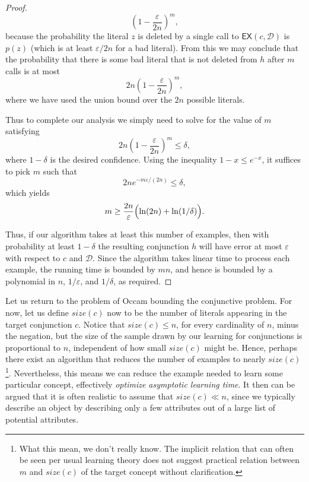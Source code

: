 \begin{proof}
    \[
    \left(1-\frac{\varepsilon}{2n}\right)^m,
    \]
    because the probability the literal $z$ is deleted by a single call to $\mathsf{EX}(c,  \mathcal{D})$ is $p(z)$ (which is at least $\varepsilon/2n$ for a bad literal).  From     this we may conclude that the probability that there is some bad literal that is not    deleted from $h$ after $m$ calls is at most
    \[
    2n\left(1-\frac{\varepsilon}{2n}\right)^m,
    \]
    where we have used the union bound over the $2n$ possible literals.

    Thus to complete our analysis we simply need to solve for the value of $m$ satisfying
    \[
    2n\left(1-\frac{\varepsilon}{2n}\right)^m \le \delta,
    \]
    where $1-\delta$ is the desired confidence.  Using the inequality $1-x \le e^{-x}$,     it suffices to pick $m$ such that
    \[
    2n e^{-m\varepsilon/(2n)} \le \delta,
    \]
    which yields
    \[
    m \ge \frac{2n}{\varepsilon}\Bigl(\ln(2n)+\ln(1/\delta)\Bigr).
    \]

    Thus, if our algorithm takes at least this number of examples, then with probability    at least $1-\delta$ the resulting conjunction $h$ will have error at most  $\varepsilon$ with respect to $c$ and $\mathcal{D}$.  Since the algorithm takes  linear time to process each example, the running time is bounded by $mn$, and hence  is bounded by a polynomial in $n$, $1/\varepsilon$, and $1/\delta$, as required.
\end{proof}

Let us return to the problem of Occam bounding the conjunctive problem. For now, let us define $size(c)$ now to be the number of literals appearing in the target conjunction $c$. Notice that $size(c)\leq n$, for every cardinality of $n$, minus the negation, but the size of the sample drawn by our learning for conjunctions is proportional to $n$, independent of how small $size(c)$ might be. Hence, perhaps there exist an algorithm that reduces the number of examples to nearly $size(c)$ \footnote{What this mean, we don't really know. The implicit relation that can often be seen per usual learning theory does not suggest practical relation between $m$ and $size(c)$ of the target concept without clarification.}. Nevertheless, this means we can reduce the example needed to learn some particular concept, effectively \textit{optimize asymptotic learning time}. It then can be argued that it is often realistic to assume that $size(c)\ll n$, since we typically describe an object by describing only a few attributes out of a large list of potential attributes. 

